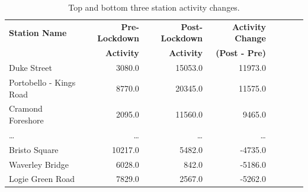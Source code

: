 \documentclass[11pt,a4paper]{article}
\begin{document}
\begin{table}[ht]
    \centering
    \begin{tabular}{lrrrrrrr}
\hline\hline
            \textbf{Station Name} &  \textbf{Pre-Lockdown} &  \textbf{Post-Lockdown} &  \textbf{Activity Change} \\ & \textbf{Activity} & \textbf{Activity} & \textbf{(Post - Pre)} \\
\hline
             Duke Street &                 3080.0 &                 15053.0 &                          11973.0 \\
 Portobello - Kings Road &                 8770.0 &                 20345.0 &                          11575.0 \\
       Cramond Foreshore &                 2095.0 &                 11560.0 &                           9465.0 \\
       \dots&\dots&\dots&\dots \\ 
       
    Bristo Square &                10217.0 &                  5482.0 &                          -4735.0 \\
  Waverley Bridge &                 6028.0 &                   842.0 &                          -5186.0 \\
 Logie Green Road &                 7829.0 &                  2567.0 &                          -5262.0 \\
       
\hline

\end{tabular}

    \caption{Top and bottom three station activity changes.}
\label{fds-project:table:activity_changes}
\end{table}
\end{document}
